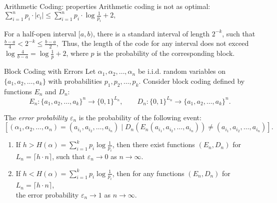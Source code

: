 \documentclass[aspectratio=169]{beamer}
\newcommand{\seqn}[2]{{#1}_1,{#1}_2,\dotsc,{#1}_{#2}}
\newcommand{\seqin}[3]{{#1}_{{#2}_1},{#1}_{{#2}_2},\dotsc,{#1}_{{#2}_{#3}}}
\begin{document}
    \begin{frame}{Arithmetic Coding: properties}
        Arithmetic coding is not as optimal:
        $
        \sum_{i=1}^n p_i \cdot |c_i| \le \sum_{i=1}^n p_i \cdot \log \frac{1}{p_i} + 2,
        $
        \pause
        \begin{theorem}
            For a half-open interval \([a,b)\), there is a standard interval of length \(2^{-k}\), such that
            \(
            \frac{b-a}{4} < 2^{-k} \le \frac{b-a}{2},
            \)
            Thus, the length of the code for any interval does not exceed \(\log \frac{4}{b-a} = \log \frac{1}{p} + 2\), where \(p\) is the probability of the corresponding block.
        \end{theorem}
        \vspace{3cm}

    \end{frame}

    \begin{frame}{Block Coding with Errors}
        Let \(\seqn{\alpha}{n}\) be i.i.d. random variables on \(\{\seqn{a}{k}\}\) with probabilities \(\seqn{p}{k}\). Consider block coding defined by functions \(E_n\) and \(D_n\):
        \[
        E_n:\{\seqn{a}{k}\}^n \to \{0,1\}^{L_n},\qquad
        D_n:\{0,1\}^{L_n} \to \{\seqn{a}{k}\}^n.
        \]

            The \emph{error probability \(\varepsilon_n\)} is the probability of the following event:
            \[
            [(\seqn{\alpha}{n}) = (\seqin{a}{i}{n}) \mid D_n(E_n(\seqin{a}{i}{n}))\neq (\seqin{a}{i}{n})].
            \]
        \begin{theorem}[Shannon]\label{thm:blockcoding}
            \begin{enumerate}
                \item If \(h > H(\alpha) = \sum_{i=1}^{k} p_i \log \frac{1}{p_i}\), then there exist functions \((E_n, D_n)\) for \(L_n = \lceil h \cdot n \rceil\), such that \(\varepsilon_n \to 0\) as \(n \to \infty\).

                \item If \(h < H(\alpha) = \sum_{i=1}^{k} p_i \log \frac{1}{p_i}\), then for any functions \((E_n, D_n)\) for \(L_n = \lceil h \cdot n \rceil\),\\ the error probability \(\varepsilon_n \to 1\) as \(n \to \infty\).
            \end{enumerate}
        \end{theorem}
    \end{frame}
\end{document}
